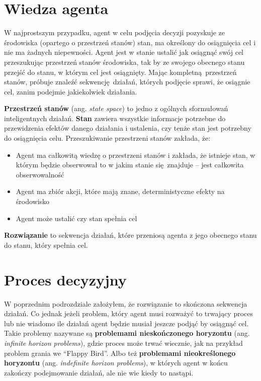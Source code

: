 \documentclass[a4paper, 12pt,oneside]{book}
\begin{document}
\section{Wiedza agenta} 
W najprostszym przypadku, agent w celu podjęcia decyzji pozyskuje ze środowiska
(opartego o przestrzeń stanów) stan, ma określony do osiągnięcia cel i nie ma
żadnych niepewności. Agent jest w stanie ustalić jak osiągnąć swój cel
przeszukując przestrzeń stanów środowiska, tak by ze swojego obecnego stanu
przejść do stanu, w którym cel jest osiągnięty. Mając kompletną przestrzeń
stanów, próbuje znaleźć sekwencję działań, których podjęcie sprawi, że osiągnie
cel, zanim podejmie jakiekolwiek działania.

\textbf{Przestrzeń stanów} (ang. \textit{state space}) to jedno z ogólnych
sformułowań inteligentnych działań. \textbf{Stan} zawiera wszystkie informacje
potrzebne do przewidzenia efektów danego działania i ustalenia, czy tenże stan
jest potrzebny do osiągnięcia celu. Przeszukiwanie przestrzeni stanów zakłada,
że:
\begin{itemize}
	\setlength\itemsep{-0.4em}
\item Agent ma całkowitą wiedzę o przestrzeni stanów i zakłada, że istnieje
	stan, w którym będzie obserwował to w jakim stanie się znajduje --
	jest całkowita obserwowalność
\item Agent ma zbiór akcji, które mają znane, deterministyczne efekty na
	środowisko
\item Agent może ustalić czy stan spełnia cel
\end{itemize}
\textbf{Rozwiązanie} to sekwencja działań, które przeniosą agenta z jego
obecnego stanu do stanu, który spełnia cel.

\section{Proces decyzyjny}
W poprzednim podrozdziale założyłem, że rozwiązanie to skończona sekwencja
działań. Co jednak jeżeli problem, który agent musi rozważyć to trwający
proces lub nie wiadomo ile działań agent będzie musiał jeszcze podjąć by
osiągnąć cel. Takie problemy nazywane
są \textbf{problemami nieskończonego horyzontu} (ang. \textit{infinite horizon
problems}), gdzie proces może trwać wiecznie, jak na przykład problem grania
we ``Flappy Bird''. Albo też \textbf{problemami nieokreślonego horyzontu} (ang.
\textit{indefinite horizon problems}), w których agent w końcu zakończy
podejmowanie działań, ale nie wie kiedy to nastąpi.
\end{document}
